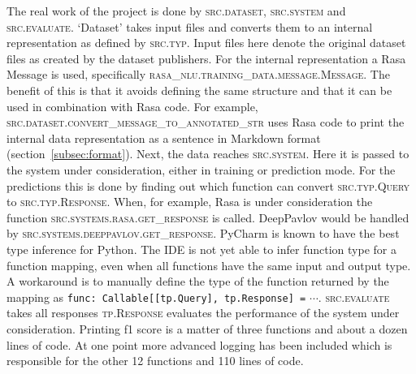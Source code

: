The real work of the project is done by \textsc{src.dataset}, \textsc{src.system} and \textsc{src.evaluate}.
`Dataset' takes input files and converts them to an internal representation as defined by \textsc{src.typ}.
Input files here denote the original dataset files as created by the dataset publishers.
For the internal representation a Rasa Message is used, specifically \textsc{rasa\_nlu.training\_data.message.Message}.
The benefit of this is that it avoids defining the same structure and that it can be used in combination with Rasa code.
For example, \textsc{src.dataset.convert\_message\_to\_annotated\_str} uses Rasa code to print the internal data representation as a sentence in Markdown format (section~\ref{subsec:format}).
Next, the data reaches \textsc{src.system}.
Here it is passed to the system under consideration, either in training or prediction mode.
For the predictions this is done by finding out which function can convert \textsc{src.typ.Query} to \textsc{src.typ.Response}.
When, for example, Rasa is under consideration the function \textsc{src.systems.rasa.get\_response} is called.
DeepPavlov would be handled by \textsc{src.systems.deeppavlov.get\_response}.
PyCharm is known to have the best type inference for Python.
The IDE is not yet able to infer function type for a function mapping, even when all functions have the same input and output type.
A workaround is to manually define the type of the function returned by the mapping as \verb|func: Callable[[tp.Query], tp.Response] =| $\cdots$.
\textsc{src.evaluate} takes all responses \textsc{tp.Response} evaluates the performance of the system under consideration.
Printing f1 score is a matter of three functions and about a dozen lines of code.
At one point more advanced logging has been included which is responsible for the other 12 functions and 110 lines of code.
